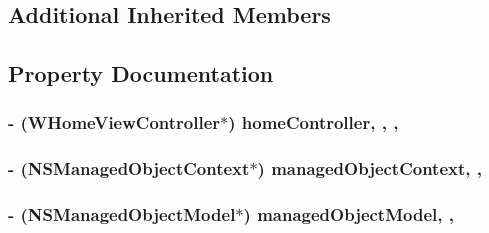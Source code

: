 \subsection*{Additional Inherited Members}


\subsection{Property Documentation}
\hypertarget{interface_w_app_delegate_abf36af1cbff7bc7efe6a1d4657b409ea}{
\subsubsection[{home\-Controller}]{\setlength{\rightskip}{0pt plus 5cm}-\/ ({\bf W\-Home\-View\-Controller}$\ast$) home\-Controller\hspace{0.3cm}{\ttfamily [read]}, {\ttfamily [write]}, {\ttfamily [nonatomic]}, {\ttfamily [strong]}}}\label{interface_w_app_delegate_abf36af1cbff7bc7efe6a1d4657b409ea}
\hypertarget{interface_w_app_delegate_afca885ae92186f927a18cb3b96b89d74}{
\subsubsection[{managed\-Object\-Context}]{\setlength{\rightskip}{0pt plus 5cm}-\/ (N\-S\-Managed\-Object\-Context$\ast$) managed\-Object\-Context\hspace{0.3cm}{\ttfamily [read]}, {\ttfamily [nonatomic]}, {\ttfamily [strong]}}}\label{interface_w_app_delegate_afca885ae92186f927a18cb3b96b89d74}
\hypertarget{interface_w_app_delegate_a3493bad40022edfb70dbb32c316d0607}{
\subsubsection[{managed\-Object\-Model}]{\setlength{\rightskip}{0pt plus 5cm}-\/ (N\-S\-Managed\-Object\-Model$\ast$) managed\-Object\-Model\hspace{0.3cm}{\ttfamily [read]}, {\ttfamily [nonatomic]}, {\ttfamily [strong]}}}\label{interface_w_app_delegate_a3493bad40022edfb70dbb32c316d0607}
